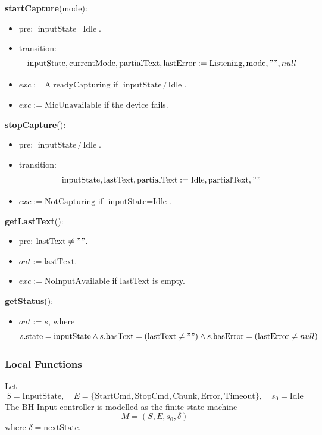 \documentclass[12pt, titlepage]{article}
\begin{document}
\noindent
\textbf{startCapture}(mode):
\begin{itemize}
  \item pre: $\text{inputState} = \text{Idle}$.
  \item transition:
  \[
    \text{inputState}, \text{currentMode}, \text{partialText}, \text{lastError}
    := \text{Listening}, \text{mode}, "", null
  \]
  \item $exc := \text{AlreadyCapturing}$ if $\text{inputState} \neq \text{Idle}$.
  \item $exc := \text{MicUnavailable}$ if the device fails.
\end{itemize}

\noindent
\textbf{stopCapture}():
\begin{itemize}
  \item pre: $\text{inputState} \neq \text{Idle}$.
  \item transition:
  \[
    \text{inputState}, \text{lastText}, \text{partialText}
    := \text{Idle}, \text{partialText}, ""
  \]
  \item $exc := \text{NotCapturing}$ if $\text{inputState} = \text{Idle}$.
\end{itemize}

\noindent
\textbf{getLastText}():
\begin{itemize}
  \item pre: $\text{lastText} \neq ""$.
  \item $out := \text{lastText}$.
  \item $exc := \text{NoInputAvailable}$ if lastText is empty.
\end{itemize}

\noindent
\textbf{getStatus}():
\begin{itemize}
  \item $out := s$, where
  \[
    s.\text{state} = \text{inputState} \land
    s.\text{hasText} = (\text{lastText} \neq "") \land
    s.\text{hasError} = (\text{lastError} \neq null)
  \]
\end{itemize}

\subsubsection{Local Functions}

Let
\[
  S = \text{InputState}, \quad
  E = \{\text{StartCmd}, \text{StopCmd}, \text{Chunk}, \text{Error},
  \text{Timeout}\}, \quad
  s_0 = \text{Idle}
\]
The BH-Input controller is modelled as the finite-state machine
\[
  M = (S, E, s_0, \delta)
\]
where $\delta = \text{nextState}$.
\end{document}
